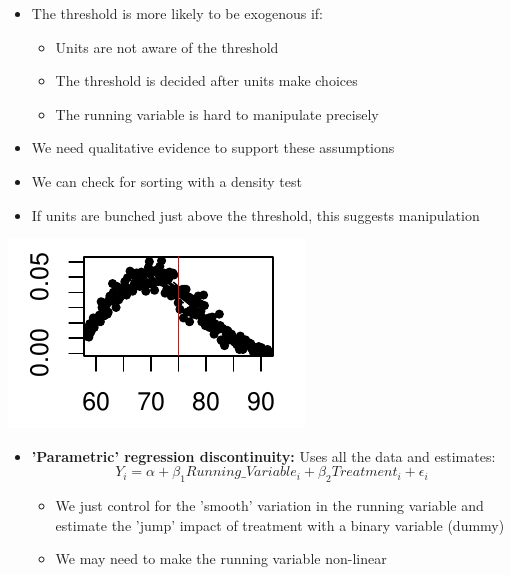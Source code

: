 \documentclass[xcolor=x11names,compress]{beamer}\usepackage[]{graphicx}\usepackage[]{xcolor}
\renewcommand{\(}{\begin{columns}}
\renewcommand{\)}{\end{columns}}
\newcommand{\<}[1]{\begin{column}{#1}}
\renewcommand{\>}{\end{column}}
\begin{document}
\begin{frame}
\begin{itemize}
\item The threshold is more likely to be exogenous if:
\pause
\begin{itemize}
\item Units are not aware of the threshold
\pause
\item The threshold is decided after units make choices
\pause
\item The running variable is hard to manipulate precisely
\pause
\end{itemize}
\item We need qualitative evidence to support these assumptions
\end{itemize}
\end{frame}

\begin{frame}
\begin{itemize}
\item We can check for sorting with a density test
\item If units are bunched just above the threshold, this suggests manipulation
\end{itemize}

\begin{center}
\includegraphics[scale=2]{figure/Density-2.pdf}
\end{center}
\end{frame}

\begin{frame}
\begin{itemize}
\item \textbf{'Parametric' regression discontinuity:} Uses all the data and estimates:
$$Y_i = \alpha + \beta_1 Running\_Variable_i + \beta_2 Treatment_i + \epsilon_i$$
\pause
\begin{itemize}
\item We just control for the 'smooth' variation in the running variable and estimate the 'jump' impact of treatment with a binary variable (dummy)
\pause
\item We may need to make the running variable non-linear
\end{itemize}
\end{itemize}
\end{frame}
\end{document}
